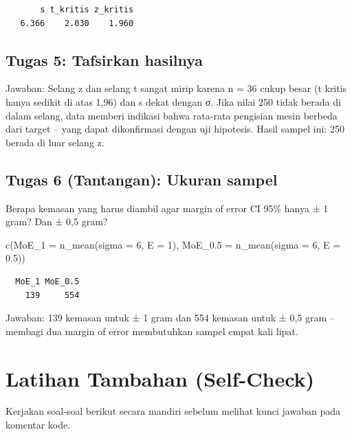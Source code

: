 \documentclass[
  indonesian,
  letterpaper,
]{book}
\newenvironment{Shaded}{\begin{snugshade}}{\end{snugshade}}
\newcommand{\AttributeTok}[1]{\textcolor[rgb]{0.40,0.45,0.13}{#1}}
\newcommand{\DecValTok}[1]{\textcolor[rgb]{0.68,0.00,0.00}{#1}}
\newcommand{\FloatTok}[1]{\textcolor[rgb]{0.68,0.00,0.00}{#1}}
\newcommand{\FunctionTok}[1]{\textcolor[rgb]{0.28,0.35,0.67}{#1}}
\newcommand{\NormalTok}[1]{\textcolor[rgb]{0.00,0.23,0.31}{#1}}
\begin{document}
\begin{verbatim}
       s t_kritis z_kritis 
   6.366    2.030    1.960 
\end{verbatim}

\subsection{Tugas 5: Tafsirkan
hasilnya}\label{tugas-5-tafsirkan-hasilnya}

Jawaban: Selang z dan selang t sangat mirip karena n = 36 cukup besar (t
kritis hanya sedikit di atas 1,96) dan s dekat dengan σ. Jika nilai 250
tidak berada di dalam selang, data memberi indikasi bahwa rata-rata
pengisian mesin berbeda dari target -- yang dapat dikonfirmasi dengan
uji hipotesis. Hasil sampel ini: 250 berada di luar selang z.

\subsection{Tugas 6 (Tantangan): Ukuran
sampel}\label{tugas-6-tantangan-ukuran-sampel}

Berapa kemasan yang harus diambil agar margin of error CI 95\% hanya ± 1
gram? Dan ± 0,5 gram?

\begin{Shaded}
\begin{Highlighting}[]
\FunctionTok{c}\NormalTok{(}\AttributeTok{MoE\_1 =} \FunctionTok{n\_mean}\NormalTok{(}\AttributeTok{sigma =} \DecValTok{6}\NormalTok{, }\AttributeTok{E =} \DecValTok{1}\NormalTok{), }\AttributeTok{MoE\_0.5 =} \FunctionTok{n\_mean}\NormalTok{(}\AttributeTok{sigma =} \DecValTok{6}\NormalTok{, }\AttributeTok{E =} \FloatTok{0.5}\NormalTok{))}
\end{Highlighting}
\end{Shaded}

\begin{verbatim}
  MoE_1 MoE_0.5 
    139     554 
\end{verbatim}

Jawaban: 139 kemasan untuk ± 1 gram dan 554 kemasan untuk ± 0,5 gram --
membagi dua margin of error membutuhkan sampel empat kali lipat.

\section{Latihan Tambahan
(Self-Check)}\label{latihan-tambahan-self-check}

Kerjakan soal-soal berikut secara mandiri sebelum melihat kunci jawaban
pada komentar kode.
\end{document}
